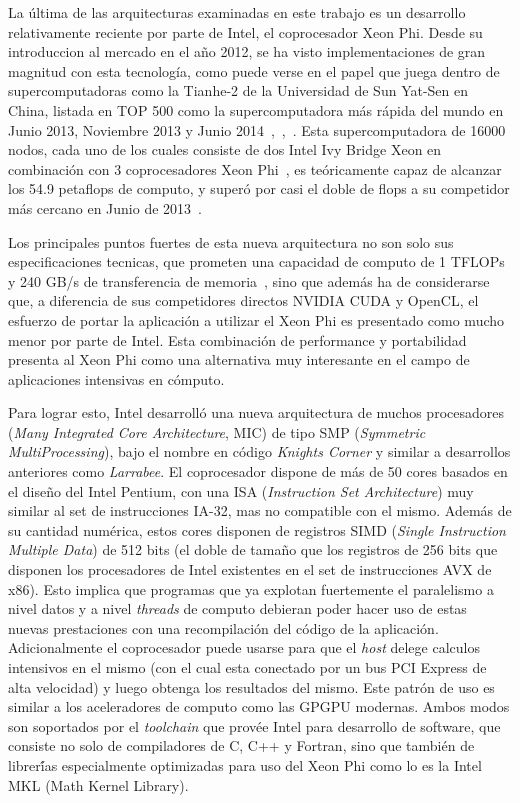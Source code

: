 La \'ultima de las arquitecturas examinadas en este trabajo es un desarrollo relativamente reciente
por parte de Intel, el coprocesador Xeon Phi. Desde su introduccion al mercado en el a\~no 2012, se ha visto implementaciones de gran magnitud con esta tecnolog\'ia, como puede verse en el papel que juega dentro de supercomputadoras como la Tianhe-2 de la Universidad de Sun Yat-Sen en China,
listada en TOP 500 como la supercomputadora más rápida del mundo en Junio 2013, Noviembre 2013 y
Junio 2014~\cite{Top500XeonPhiJune2013},~\cite{Top500XeonPhiNov2013},~\cite{Top500XeonPhiJune2014}. Esta supercomputadora de 16000 nodos, cada uno de los cuales consiste de dos Intel
Ivy Bridge Xeon en combinaci\'on con 3 coprocesadores Xeon Phi~\cite{Top500XeonPhiJune2013}, es te\'oricamente capaz de alcanzar los
54.9 petaflops de computo, y super\'o por casi el doble de flops a su competidor m\'as cercano en
Junio de 2013~\cite{Top500XeonPhiJune2013}.

Los principales puntos fuertes de esta nueva arquitectura no son solo sus especificaciones tecnicas, que prometen una
capacidad de computo de 1 TFLOPs y 240 GB/s de transferencia de memoria~\cite{Fang}, sino que además ha de considerarse
que, a diferencia de sus competidores directos NVIDIA CUDA y OpenCL, el esfuerzo de portar la aplicación a utilizar
el Xeon Phi es presentado como mucho menor por parte de Intel. Esta combinación de performance y portabilidad
presenta al Xeon Phi como una alternativa muy interesante en el campo de aplicaciones intensivas en cómputo.

Para lograr esto, Intel desarroll\'o una nueva arquitectura de muchos procesadores (\textit{Many Integrated Core Architecture}, MIC) de
tipo SMP (\textit{Symmetric MultiProcessing}), bajo el nombre en código \textit{Knights Corner} y similar a desarrollos anteriores como \textit{Larrabee}. El coprocesador dispone de más de 50 cores basados en el dise\~no del Intel Pentium, con una ISA (\textit{Instruction Set Architecture}) muy similar al set de instrucciones IA-32, mas no compatible con el mismo. Además de su cantidad
numérica, estos cores disponen de registros SIMD (\textit{Single Instruction Multiple Data}) de 512 bits (el doble de tamaño que los registros de 256
bits que disponen los procesadores de Intel existentes en el set de instrucciones AVX de x86). Esto implica que programas
que ya explotan fuertemente el paralelismo a nivel datos y a nivel \textit{threads} de computo debieran poder hacer uso de
estas nuevas prestaciones con una recompilación del c\'odigo de la aplicaci\'on. Adicionalmente el coprocesador puede usarse para que el
\textit{host} delege calculos intensivos en el mismo (con el cual esta conectado por un bus
PCI Express de alta velocidad) y luego obtenga los resultados del mismo. Este patr\'on de uso es similar a los aceleradores de computo como las GPGPU modernas. Ambos modos son soportados por el \textit{toolchain} que prov\'ee Intel para desarrollo de software, que consiste no solo de compiladores de C, C++ y Fortran, sino que también de librer\'ías especialmente optimizadas para uso del Xeon Phi como lo es la Intel MKL (Math Kernel Library).~\cite{IntelXeonPhiWhitePaper}

